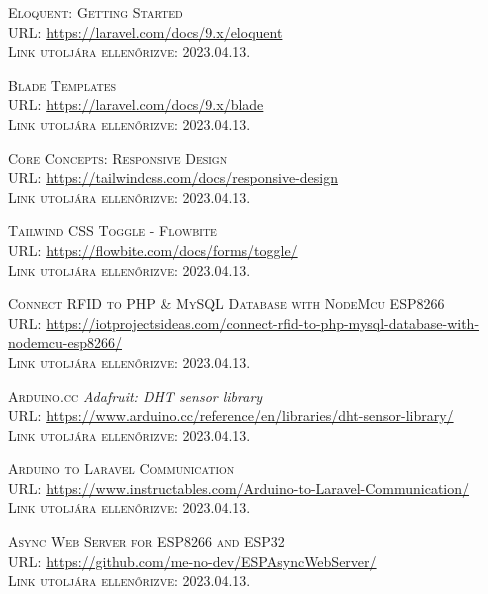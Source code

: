 \documentclass[
]{thesis-ekf}
\theoremstyle{definition}
\theoremstyle{remark}
\begin{document}
\begin{thebibliography}{46}
		\textsc{Eloquent: Getting Started}\\
		\textsc{URL:} \url{https://laravel.com/docs/9.x/eloquent}\\
		\textsc{Link utoljára ellenőrizve:} 2023.04.13.
		
		\textsc{Blade Templates}\\
		\textsc{URL:} \url{https://laravel.com/docs/9.x/blade}\\
		\textsc{Link utoljára ellenőrizve:} 2023.04.13.
		
		\textsc{Core Concepts: Responsive Design}\\
		\textsc{URL:} \url{https://tailwindcss.com/docs/responsive-design}\\
		\textsc{Link utoljára ellenőrizve:} 2023.04.13.
		
		\textsc{Tailwind CSS Toggle - Flowbite}\\
		\textsc{URL:} \url{https://flowbite.com/docs/forms/toggle/}\\
		\textsc{Link utoljára ellenőrizve:} 2023.04.13.
		
		\textsc{Connect RFID to PHP \& MySQL Database with NodeMcu ESP8266}\\
		\textsc{URL:} \url{https://iotprojectsideas.com/connect-rfid-to-php-mysql-database-with-nodemcu-esp8266/}\\
		\textsc{Link utoljára ellenőrizve:} 2023.04.13.
		
		\textsc{Arduino.cc} \emph{Adafruit: DHT sensor library}\\
		\textsc{URL:} \url{https://www.arduino.cc/reference/en/libraries/dht-sensor-library/}\\
		\textsc{Link utoljára ellenőrizve:} 2023.04.13.
		
		\textsc{Arduino to Laravel Communication}\\
		\textsc{URL:} \url{https://www.instructables.com/Arduino-to-Laravel-Communication/}\\
		\textsc{Link utoljára ellenőrizve:} 2023.04.13.
		
		\textsc{Async Web Server for ESP8266 and ESP32}\\
		\textsc{URL:} \url{https://github.com/me-no-dev/ESPAsyncWebServer/}\\
		\textsc{Link utoljára ellenőrizve:} 2023.04.13.
		

\end{thebibliography}
\end{document}
